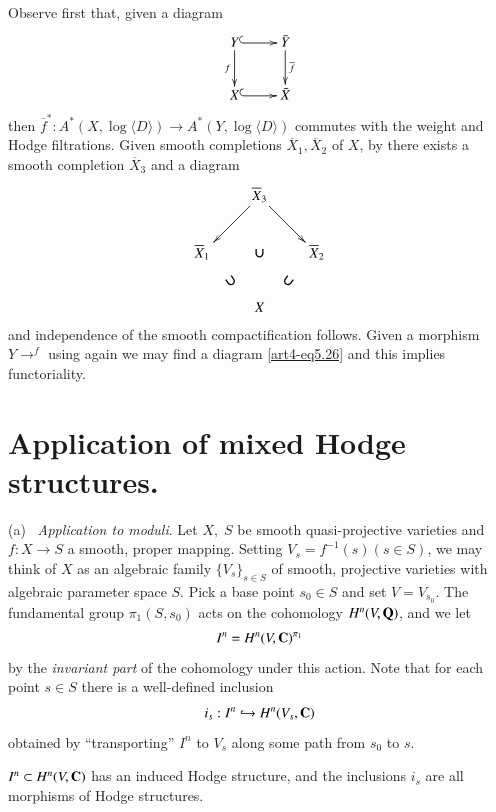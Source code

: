 \begin{enumerate}
Observe first that, given a diagram
\begin{equation}
\vcenter{
\xymatrix{
Y \ar@{^{(}->}[r] \ar[d]_-f & \bar{Y} \ar[d]^-{\overline{f}}\\
X \ar@{^{(}->}[r] & \bar{X}}}\label{art4-eq5.26}
\end{equation}
then $\overline{f}^\ast : A^\ast (X, \log \langle D \rangle) \to A^{\ast} (Y, \log \langle D \rangle)$ commutes with the weight and Hodge filtrations. Given smooth completions $\overline{X}_1, \overline{X}_2$ of $X$, by \cite{art4-key29} there exists a smooth completion $\overline{X}_3$ and a diagram
$$
\xymatrix{
& \overline{X}_3 \ar[dl] \ar[dr]&\\
\overline{X}_1 & \text{\boldmath$\cup$}  & \overline{X}_2 \\
& X \ar@{}[ul]|{\displaystyle{\rotatebox{35}{\boldmath$\cup$}}} \ar@{}[ur]|{\displaystyle{\rotatebox{-35}{\boldmath$\cup$}}} & 
}
$$
and independence of the smooth compactification follows. Given a morphism $ Y {\displaystyle{\mathop{\longrightarrow}^f}}$ using \cite{art4-key29} again we may find a diagram \eqref{art4-eq5.26} and this implies functoriality. 
\end{enumerate}

\section{Application of mixed Hodge structures.}\label{art4-sec6}
(a)~ \textit{Application to moduli}. Let $X, \; S$ be smooth quasi-projective varieties and $f: X \to S$ a smooth, proper mapping. Setting $V_s = f^{-1} (s) (s \in S)$, we may think of $X$ as an algebraic family $\{V_s\}_{s \in S}$ of smooth, projective varieties with algebraic parameter space $S$. Pick a base point $s_0 \in S$ and set $V = V_{s_0}$. The fundamental group $\pi_1 (S, s_0)$ acts on the cohomology $H^n (V, \mathbf{Q})$, and we let
$$
I^n  = H^n (V, \mathbf{C})^{\pi_1}
$$
by the \textit{invariant part} of the cohomology under this action. Note that for each point $s \in S$ there is a well-defined inclusion
$$
i_s : I^n \hookrightarrow H^n (V_s, \mathbf{C})
$$\pageoriginale
obtained by ``transporting'' $I^n$ to $V_s$ along some path from $s_0$ to $s$.

\setcounter{equation}{0}
\begin{proposition}\label{art4-prop6.1}
$I^n \subset H^n (V, \mathbf{C})$ has an induced Hodge structure, and the inclusions $i_s$ are all morphisms of Hodge structures. 
\end{proposition}

